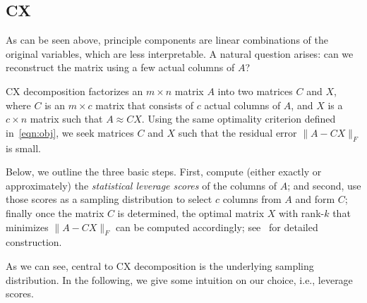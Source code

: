 \subsection{CX}
As can be seen above, principle components are linear combinations of the original variables, which are less interpretable. A natural question arises: can we reconstruct the matrix using a few actual columns of $A$?

CX decomposition factorizes an $m \times n$ matrix $A$ into two matrices $C$ and $X$, where $C$ is an $m\times c$ matrix that consists of $c$ actual columns
of $A$, and $X$ is a $c \times n$ matrix such that $A\approx CX$.
Using the same optimality criterion defined in~\eqref{eqn:obj}, we seek matrices $C$ and $X$ such that the residual error $\|A-CX\|_F$ is small.

Below, we outline the three basic steps. First, compute (either exactly or approximately) the {\it statistical leverage scores} of the columns of $A$;
and second, use those scores as a sampling distribution to select $c$ columns from $A$ and form $C$;
finally once the matrix $C$ is determined, the optimal matrix $X$ with rank-$k$ that minimizes $\|A-CX\|_F$ can be computed accordingly; see~\cite{DMM08} for detailed construction.

As we can see, central to CX decomposition is the underlying sampling distribution.
In the following, we give some intuition on our choice, i.e., leverage scores.

